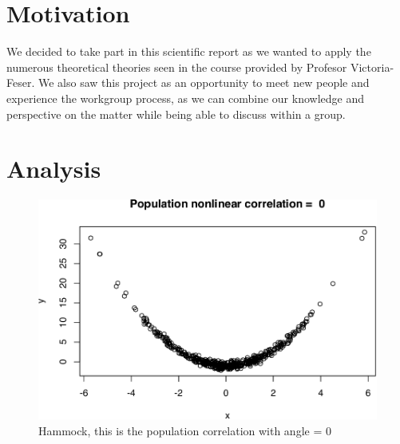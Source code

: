 \documentclass[11pt,]{article}
\begin{document}
\hypertarget{motivation}{%
\section{Motivation}\label{motivation}}

We decided to take part in this scientific report as we wanted to apply
the numerous theoretical theories seen in the course provided by
Profesor Victoria-Feser. We also saw this project as an opportunity to
meet new people and experience the workgroup process, as we can combine
our knowledge and perspective on the matter while being able to discuss
within a group.

\hypertarget{analysis}{%
\section{Analysis}\label{analysis}}

\begin{figure}

{\centering \includegraphics{RapportSTAT_files/figure-latex/nonlinear_q1-1} 

}

\caption{Hammock, this is the population correlation with angle = 0}\label{fig:nonlinear_q1}
\end{figure}
\end{document}

